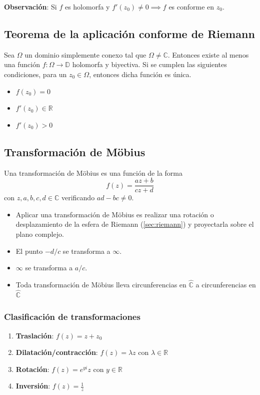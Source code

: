 \documentclass[paper=a4, fontsize=11pt]{scrartcl}
\numberwithin{equation}{section}
\numberwithin{figure}{section}
\numberwithin{table}{section}
\begin{document}
\textbf{Observación}: Si $f$ es holomorfa y $f'(z_0)\neq 0 \implies f$ es conforme en $z_0$.

\subsection{Teorema de la aplicación conforme de Riemann}
Sea $\Omega$ un dominio simplemente conexo tal que $\Omega\neq\mathbb{C}$. Entonces existe al menos una función $f:\Omega\to\mathbb{D}$ holomorfa y biyectiva.
Si se cumplen las siguientes condiciones, para un $z_0\in\Omega$, entonces dicha función es única.
\begin{itemize}
\item $f(z_0)=0$
\item $f'(z_0)\in\mathbb{R}$
\item $f'(z_0)>0$
\end{itemize}

\subsection{Transformación de Möbius}
Una transformación de Möbius es una función de la forma
$$f(z) = \frac{az+b}{cz+d}$$
con $z,a,b,c,d\in\mathbb{C}$ verificando $ad-bc\neq 0$.
\begin{itemize}
\item Aplicar una transformación de Möbius es realizar una rotación o desplazamiento de la esfera de Riemann (\ref{sec:riemann}) y proyectarla sobre el plano complejo.
\item El punto $-d/c$ se transforma a $\infty$.
\item $\infty$ se transforma a $a/c$.
\item Toda transformación de Möbius lleva circunferencias en $\hat{\mathbb{C}}$ a circunferencias en $\hat{\mathbb{C}}$
\end{itemize}

\subsubsection{Clasificación de transformaciones}
\begin{enumerate}
\item \textbf{Traslación}: $f(z) = z+z_0$
\item \textbf{Dilatación/contracción}: $f(z) = \lambda z$ con $\lambda\in \mathbb{R}$
\item \textbf{Rotación}: $f(z) = e^{yi}z$ con $y\in\mathbb{R}$
\item \textbf{Inversión}: $f(z) = \frac{1}{z}$
\end{enumerate}
\end{document}
